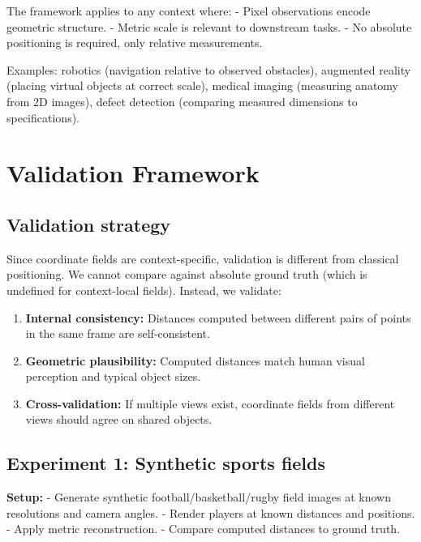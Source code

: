 \documentclass[11pt,twocolumn,a4paper]{article}
\theoremstyle{definition}
\begin{document}
The framework applies to any context where:
- Pixel observations encode geometric structure.
- Metric scale is relevant to downstream tasks.
- No absolute positioning is required, only relative measurements.

Examples: robotics (navigation relative to observed obstacles), augmented reality (placing virtual objects at correct scale), medical imaging (measuring anatomy from 2D images), defect detection (comparing measured dimensions to specifications).

\section{Validation Framework}
\label{sec:validation}

\subsection{Validation strategy}

Since coordinate fields are context-specific, validation is different from classical positioning. We cannot compare against absolute ground truth (which is undefined for context-local fields). Instead, we validate:

\begin{enumerate}[leftmargin=1.4em]
  \item \textbf{Internal consistency:} Distances computed between different pairs of points in the same frame are self-consistent.
  \item \textbf{Geometric plausibility:} Computed distances match human visual perception and typical object sizes.
  \item \textbf{Cross-validation:} If multiple views exist, coordinate fields from different views should agree on shared objects.
\end{enumerate}

\subsection{Experiment 1: Synthetic sports fields}

\textbf{Setup:}
- Generate synthetic football/basketball/rugby field images at known resolutions and camera angles.
- Render players at known distances and positions.
- Apply metric reconstruction.
- Compare computed distances to ground truth.
\end{document}
